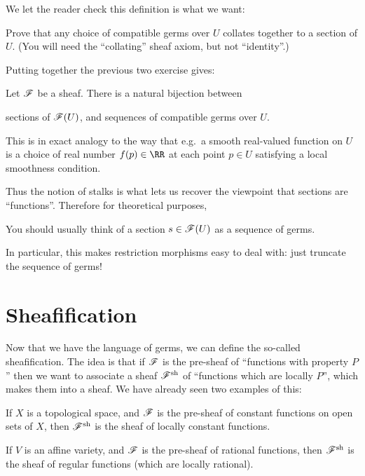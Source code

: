 We let the reader check this definition is what we want:
\begin{exercise}
	Prove that any choice of compatible germs over $U$
	collates together to a section of $U$.
	(You will need the ``collating'' sheaf axiom, but not ``identity''.)
\end{exercise}

Putting together the previous two exercise gives:
\begin{theorem}
	Let $\mathscr F$ be a sheaf.
	There is a natural bijection between
	\begin{itemize}
		\ii sections of $\mathscr F(U)$, and
		\ii sequences of compatible germs over $U$.
	\end{itemize}
\end{theorem}
This is in exact analogy to the way that e.g.\
a smooth real-valued function on $U$ is a choice
of real number $f(p) \in \RR$ at each point $p \in U$
satisfying a local smoothness condition.

Thus the notion of stalks is what lets us recover the viewpoint
that sections are ``functions''.  Therefore for theoretical purposes,
\begin{moral}
	You should usually think of a section $s \in \mathscr F(U)$ as a sequence of germs.
\end{moral}
In particular, this makes restriction morphisms easy to deal with:
just truncate the sequence of germs!

\section{Sheafification}

Now that we have the language of germs,
we can define the so-called sheafification.
The idea is that if $\mathscr F$ is the pre-sheaf of ``functions with property $P$''
then we want to associate a sheaf $\mathscr F^\mathrm{sh}$ of
``functions which are locally $P$'', which makes them into a sheaf.
We have already seen two examples of this:
\begin{example}
	[Sheafification]
	\listhack
	\begin{enumerate}[(a)]
		\ii If $X$ is a topological space,
		and $\mathscr F$ is the pre-sheaf of constant functions on open sets of $X$,
		then $\mathscr F^\mathrm{sh}$ is the sheaf of locally constant functions.

		\ii If $V$ is an affine variety,
		and $\mathscr F$ is the pre-sheaf of rational functions,
		then $\mathscr F^\mathrm{sh}$ is the sheaf of regular functions
		(which are locally rational).
	\end{enumerate}
\end{example}

